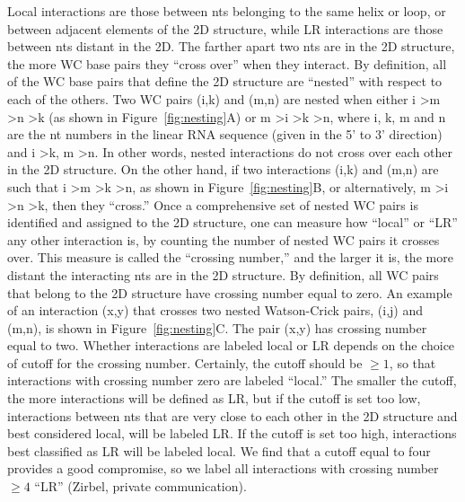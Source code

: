 Local interactions are those between nts belonging to the same helix or loop, or
between adjacent elements of the 2D structure, while LR interactions are those
between nts distant in the 2D. The farther apart two nts are in the 2D
structure, the more WC base pairs they ``cross over'' when they interact. By
definition, all of the WC base pairs that define the 2D structure are ``nested''
with respect to each of the others.  Two WC pairs (i,k) and (m,n) are nested
when either i \textgreater m \textgreater n \textgreater k (as shown in
Figure~\ref{fig:nesting}A) or m \textgreater i \textgreater k \textgreater n,
where i, k, m and n are the nt numbers in the linear RNA sequence (given in the
5’ to 3’ direction) and i \textgreater k, m \textgreater n. In other words,
nested interactions do not cross over each other in the 2D structure. On the
other hand, if two interactions (i,k) and (m,n) are such that i \textgreater m
\textgreater k \textgreater n, as shown in Figure~\ref{fig:nesting}B, or
alternatively, m \textgreater i \textgreater n \textgreater k, then they
``cross.'' Once a comprehensive set of nested WC pairs is identified and
assigned to the 2D structure, one can measure how ``local'' or ``LR'' any other
interaction is, by counting the number of nested WC pairs it crosses over. This
measure is called the “crossing number,” and the larger it is, the more distant
the interacting nts are in the 2D structure.  By definition, all WC pairs that
belong to the 2D structure have crossing number equal to zero. An example of an
interaction (x,y) that crosses two nested Watson-Crick pairs, (i,j) and (m,n),
is shown in Figure~\ref{fig:nesting}C. The pair (x,y) has crossing number equal
to two. Whether interactions are labeled local or LR depends on the choice of
cutoff for the crossing number. Certainly, the cutoff should be $\ge 1$, so that
interactions with crossing number zero are labeled ``local.'' The smaller the
cutoff, the more interactions will be defined as LR, but if the cutoff is set
too low, interactions between nts that are very close to each other in the 2D
structure and best considered local, will be labeled LR. If the cutoff is set
too high, interactions best classified as LR will be labeled local. We find that
a cutoff equal to four provides a good compromise, so we label all interactions
with crossing number $\ge 4$ ``LR'' (Zirbel, private communication). 

